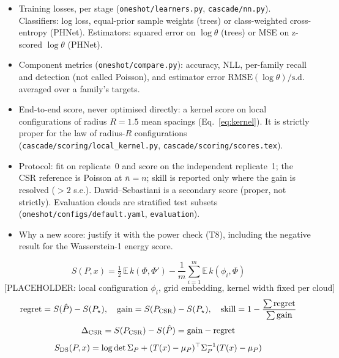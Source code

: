 \documentclass[twoside]{article}
\newcommand{\src}[1]{{\footnotesize\texttt{#1}}}
\newcommand{\nb}{\bar n}
\begin{document}
\begin{itemize}
  \item Training losses, per stage (\src{oneshot/learners.py}, \src{cascade/nn.py}). Classifiers: log loss,
        equal-prior sample weights (trees) or class-weighted cross-entropy (PHNet). Estimators: squared error on
        $\log\theta$ (trees) or MSE on z-scored $\log\theta$ (PHNet).
  \item Component metrics (\src{oneshot/compare.py}): accuracy, NLL, per-family recall and detection (not called
        Poisson), and estimator error $\mathrm{RMSE}(\log\theta)/\mathrm{s.d.}$ averaged over a family's targets.
  \item End-to-end score, never optimised directly: a kernel score on local configurations of radius $R=1.5$ mean
        spacings (Eq.~\ref{eq:kernel}). It is strictly proper for the law of radius-$R$ configurations
        (\src{cascade/scoring/local\_kernel.py}, \src{cascade/scoring/scores.tex}).
  \item Protocol: fit on replicate~0 and score on the independent replicate~1; the CSR reference is Poisson at
        $\nb=n$; skill is reported only where the gain is resolved ($>2$ s.e.). Dawid--Sebastiani is a secondary
        score (proper, not strictly). Evaluation clouds are stratified test subsets
        (\src{oneshot/configs/default.yaml}, \texttt{evaluation}).
  \item Why a new score: justify it with the power check (T8), including the negative result for the
        Wasserstein-1 energy score.
\end{itemize}

\begin{equation}
  S(P,x)=\tfrac12\,\mathbb{E}\,k(\Phi,\Phi')-\frac1m\sum_{i=1}^{m}\mathbb{E}\,k(\phi_i,\Phi)
  \label{eq:kernel}
\end{equation}
\begin{equation}
  \text{[PLACEHOLDER: local configuration $\phi_i$, grid embedding, kernel width fixed per cloud]}
  \label{eq:embedding}
\end{equation}
\begin{equation}
  \mathrm{regret}=S(\hat P)-S(P_\star),\quad
  \mathrm{gain}=S(P_{\rm CSR})-S(P_\star),\quad
  \mathrm{skill}=1-\frac{\sum\mathrm{regret}}{\sum\mathrm{gain}}
  \label{eq:skill}
\end{equation}
\begin{equation}
  \Delta_{\rm CSR}=S(P_{\rm CSR})-S(\hat P)=\mathrm{gain}-\mathrm{regret}
  \label{eq:gap}
\end{equation}
\begin{equation}
  S_{\rm DS}(P,x)=\log\det\Sigma_P+(T(x)-\mu_P)^{\top}\Sigma_P^{-1}(T(x)-\mu_P)
  \label{eq:dss}
\end{equation}
\end{document}
